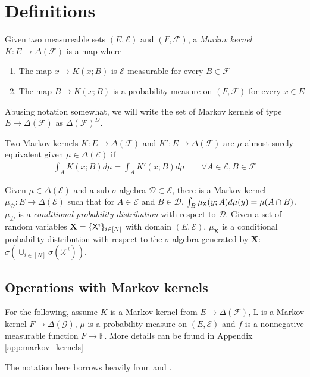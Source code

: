 \section{Definitions}
Given two measureable sets $(E,\mathcal{E})$ and $(F,\mathcal{F})$, a \emph{Markov kernel} $K:E\to \Delta(\mathcal{F})$ is a map where
\begin{enumerate}
    \item The map $x\mapsto K(x;B)$ is $\mathcal{E}$-measurable for every $B\in\mathcal{F}$
    \item The map $B\mapsto K(x;B)$ is a probability measure on $(F,\mathcal{F})$ for every $x\in E$ 
\end{enumerate}

Abusing notation somewhat, we will write the set of Markov kernels of type $E\to \Delta(\mathcal{F})$ as $\Delta(\mathcal{F})^D$.

Two Markov kernels $K:E\to \Delta(\mathcal{F})$ and $K':E\to \Delta(\mathcal{F})$ are $\mu$-almost surely equivalent given $\mu\in \Delta(\mathcal{E})$ if
\begin{align}
    \int_A K(x;B) d\mu = \int_A K'(x;B) d\mu\qquad\forall A\in \mathcal{E}, B\in\mathcal{F}
\end{align}

Given $\mu\in \Delta(\mathcal{E})$ and a sub-$\sigma$-algebra $\mathcal{D}\subset\mathcal{E}$, there is a Markov kernel $\mu_{\mathcal{D}}:E\to\Delta(\mathcal{E})$ such that for $A\in\mathcal{E}$ and $B\in \mathcal{D}$, $\int_B \mu_{\mathsf{X}}(y;A) d\mu(y) = \mu(A\cap B)$. $\mu_{\mathcal{D}}$ is a \emph{conditional probability distribution} with respect to $\mathcal{D}$. Given a set of random variables $\mathbf{X}=\{\mathsf{X}^i\}_{i\in [N]}$ with domain $(E,\mathcal{E})$, $\mu_{\mathbf{X}}$ is a conditional probability distribution with respect to the $\sigma$-algebra generated by $\mathbf{X}$: $\sigma(\cup_{i\in[N]}\sigma(\mathcal{X}^i))$.

\subsection{Operations with Markov kernels}

For the following, assume $K$ is a Markov kernel from $E\to \Delta(\mathcal{F})$, L is a Markov kernel $F\to \Delta(\mathcal{G})$, $\mu$ is a probability measure on $(E,\mathcal{E})$ and $f$ is a nonnegative measurable function $F\to \mathbb{F}$. More details can be found in Appendix \ref{app:markov_kernels}

The notation here borrows heavily from \cite{cinlar_probability_2011} and \cite{fong_causal_2013}.

